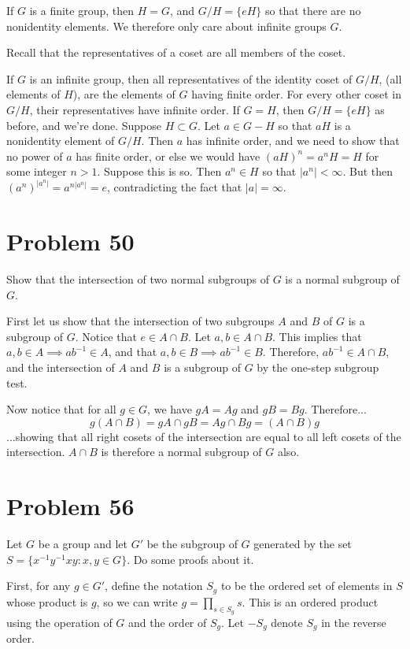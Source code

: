 \documentclass{article}
\begin{document}
If $G$ is a finite group, then $H=G$, and $G/H=\{eH\}$ so that there are
no nonidentity elements.  We therefore only care about infinite groups $G$.

Recall that the representatives of a coset are all members of the coset.

If $G$ is an infinite group, then all representatives of the identity
coset of $G/H$, (all elements of $H$), are the elements of $G$ having finite order.
For every other coset in $G/H$, their representatives have infinite order.
If $G=H$, then $G/H=\{eH\}$ as before, and we're done.  Suppose $H\subset G$.
Let $a\in G-H$ so that $aH$ is a nonidentity element of $G/H$.
Then $a$ has infinite order, and we need to show that no power
of $a$ has finite order, or else we would have $(aH)^n=a^nH=H$ for some
integer $n>1$.  Suppose this is so.  Then $a^n\in H$ so that $|a^n|<\infty$.
But then $(a^n)^{|a^n|}=a^{n|a^n|}=e$, contradicting the fact that $|a|=\infty$.

\section*{Problem 50}

Show that the intersection of two normal subgroups of $G$ is a normal subgroup of $G$.

First let us show that the intersection of two subgroups $A$ and $B$ of $G$ is a subgroup of $G$.
Notice that $e\in A\cap B$.  Let $a,b\in A\cap B$.
This implies that $a,b\in A\implies ab^{-1}\in A$, and that $a,b\in B\implies ab^{-1}\in B$.
Therefore, $ab^{-1}\in A\cap B$, and the intersection of $A$ and $B$ is a subgroup of $G$
by the one-step subgroup test.

Now notice that for all $g\in G$, we have $gA=Ag$ and $gB=Bg$.
Therefore...
\begin{equation*}
g(A\cap B) = gA\cap gB = Ag\cap Bg = (A\cap B)g
\end{equation*}
...showing that all right cosets of the intersection are equal to all left
cosets of the intersection.  $A\cap B$ is therefore a normal subgroup of $G$ also.

\section*{Problem 56}

Let $G$ be a group and let $G'$ be the subgroup of $G$ generated by the
set $S=\{x^{-1}y^{-1}xy:x,y\in G\}$.  Do some proofs about it.

First, for any $g\in G'$, define the notation $S_g$ to be the ordered set of elements
in $S$ whose product is $g$, so we can write $g=\prod_{s\in S_g}s$.  This is an ordered product
using the operation of $G$ and the order of $S_g$.
Let $-S_g$ denote $S_g$ in the reverse order.
\end{document}
